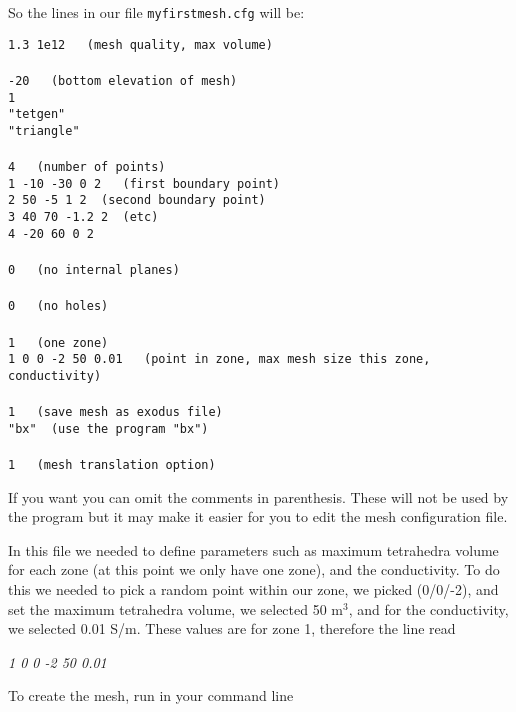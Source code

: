 \documentclass[11pt]{article}
\begin{document}
\newpage
So the lines in our file \verb+myfirstmesh.cfg+ will be:

\verb+1.3 1e12   (mesh quality, max volume)+\\
\verb++\\
\verb+-20   (bottom elevation of mesh)+\\
\verb+1+\\
\verb+"tetgen"+\\
\verb+"triangle"+\\
\verb++\\
\verb+4   (number of points)+\\
\verb+1 -10 -30 0 2   (first boundary point)+\\
\verb+2 50 -5 1 2  (second boundary point)+\\
\verb+3 40 70 -1.2 2  (etc)+\\
\verb+4 -20 60 0 2+\\
\verb++\\
\verb+0   (no internal planes)+\\
\verb++\\
\verb+0   (no holes)+\\
\verb++\\
\verb+1   (one zone)+\\
\verb+1 0 0 -2 50 0.01   (point in zone, max mesh size this zone, conductivity)+\\
\verb++\\
\verb+1   (save mesh as exodus file)+\\
\verb+"bx"  (use the program "bx")+\\
\verb++\\
\verb+1   (mesh translation option)+


\vspace{2cm}

If you want you can omit the comments in parenthesis. These will not
be used by the program but it may make it easier for you to edit the
mesh configuration file.

In this file we needed to define parameters such as maximum tetrahedra
volume for each zone (at this point we only have one zone), and the
conductivity. To do this we needed to pick a random point within our
zone, we picked (0/0/-2), and set the maximum tetrahedra volume, we
selected 50 m$^3$, and for the conductivity, we selected 0.01
S/m. These values are for zone 1, therefore the line read

\emph{1 0 0 -2 50 0.01}

To create the mesh, run in your command line
\end{document}
